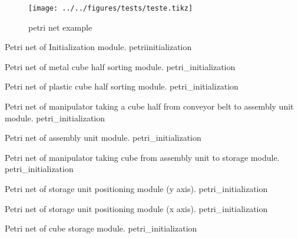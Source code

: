 


\OmegaSet

\begin{figure}[H]
  \centering
  \texttt{[image: ../../figures/tests/teste.tikz]}
  \caption{petri net example}
  \label{fig:petrinetexample}
\end{figure}


\clearpage

{Petri net of Initialization module.}
{petriinitialization}



{Petri net of metal cube half sorting module.}
{petri_initialization}



{Petri net of plastic cube half sorting module.}
{petri_initialization}



{Petri net of manipulator taking a cube half from conveyor belt to assembly unit
  module.}
{petri_initialization}


 
{Petri net of assembly unit module.}
{petri_initialization}



{Petri net of manipulator taking cube from assembly unit to storage module.}
{petri_initialization}



{Petri net of storage unit positioning module (y axis).}
{petri_initialization}



{Petri net of storage unit positioning module (x axis).}
{petri_initialization}



{Petri net of cube storage module.}
{petri_initialization}








